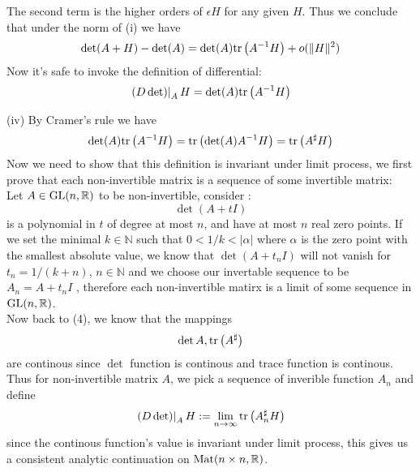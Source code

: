 \documentclass[12pt]{article}
\def\mat#1{{\rm Mat}(#1\times #1,\mathbb{R})}
\def\GL{{\rm GL}(n,\mathbb{R}) }
\def\tr#1{{\rm tr}\left(#1\right)}
\begin{document}
{The second term is the higher orders of $\epsilon H$ for any given $H$. Thus we conclude that under the norm of (i) we have
$$
\det(A+H)-\det(A)=\det(A)\tr {A^{-1} H}+o(\|H\|^2)
$$
Now it's safe to invoke the definition of differential:
$$
\left.(D \det)\right|_AH=\det(A)\tr {A^{-1} H}
$$
\item[(iv)] 
By Cramer's rule we have
\begin{equation}
\det(A)\tr {A^{-1} H}=\tr {\det(A)A^{-1} H}=\tr {A^{\sharp} H}
\end{equation}
Now we need to show that this definition is invariant under limit process, we first prove that each non-invertible matrix is a sequence of some invertible matrix:\\
Let $A\in\GL$ to be non-invertible, consider :
$$
\det(A+tI)
$$ 
is a polynomial in $t$ of degree at most $n$, and have at most $n$ real zero points. If we set the minimal $k\in\mathbb{N}$ such that $0<1/k<|\alpha|$ where $\alpha$ is the zero point with the smallest absolute value, we know that $\det(A+t_nI)$ will not vanish for $t_n=1/(k+n)$, $n\in\mathbb{N}$ and we choose our invertable sequence to be $A_n=A+t_nI$
, therefore each non-invertible
 matirx is a limit of some sequence in $ \GL$.\\
 Now back to (4), we know that the mappings
 $$
 \det A, \tr{A^{\sharp}}
 $$
 are continous since $\det$ function is continous and trace function is continous. Thus 
 for non-invertible matrix $A$, we pick a sequence of inverible function $A_n$ and 
 define 
 $$
\left.(D \det)\right|_AH:=\lim_{n\to\infty}\tr {A_n^{\sharp} H}
 $$
 since the continous function's value is invariant under limit process, this gives us a
 consistent analytic continuation on $\mat{n}$.
}
\end{document}
